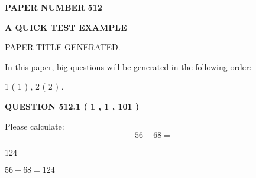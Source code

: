 \documentclass[12pt]{article}
\begin{document}
   
   
   
\newpage 
\setcounter{page}{ 
   512001 } 
   
   
   
   
 {\textbf{ \Large{ PAPER NUMBER  512  }}}
   
   
\vspace{0.2in}
   
   
   
   
   
   
   
   
 \vspace{0.2in}
{\LARGE {\textbf{ A QUICK TEST EXAMPLE}}}
   
   
 PAPER TITLE GENERATED.
   
   
   
\vspace{0.2in}
   
In this paper, big questions will be generated in the following order: 
   
   
   1 ( 1 )
 ,
   2 ( 2 )
 .
  
\vspace{0.2in}
  
{\textbf{\Large{QUESTION
512.1 
 ( 1 , 1 , 101 )
}}}
  
  
 
Please calculate:
\begin{equation}
56 +  %
68 = \nonumber
\end{equation}
 
 
 
\noindent{}
 
 

124
 
 
\noindent{}
 
 

 
 
 
\noindent{}
 
 

$ %
56 +  %
68=   %
124$
 
 
\noindent{}
 
 

 
   
\end{document}
